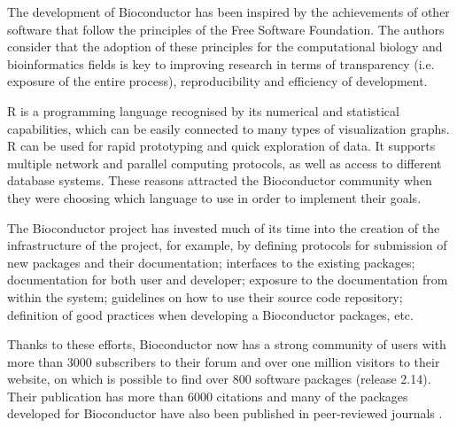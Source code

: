 The development of Bioconductor has been inspired by the achievements of other software that follow the principles of the Free Software Foundation. The authors consider that the adoption of these principles for the computational biology and bioinformatics fields is key to improving research in terms of transparency (i.e. exposure of the entire process), reproducibility and efficiency of development.

R is a programming language recognised by its numerical and statistical capabilities, which can be easily connected to many types of visualization graphs. R can be used for rapid prototyping and quick exploration of data. It supports multiple network and parallel computing protocols, as well as access to different database systems. These reasons attracted the Bioconductor community when they were choosing which language to use in order to implement their goals.

The Bioconductor project has invested much of its time into the creation of the infrastructure of the project, for example, by defining protocols for submission of new packages and their documentation; interfaces to the existing packages; documentation for both user and developer; exposure to the documentation from within the system; guidelines on how to use their source code repository; definition of good practices when developing a Bioconductor packages, etc.

Thanks to these efforts, Bioconductor now has a strong community of users with more than 3000 subscribers to their forum and over one million visitors to their website, on which is possible to find over 800 software packages (release 2.14). Their publication \cite{GEN2004} has more than 6000 citations and many of the packages developed for Bioconductor have also been published in peer-reviewed journals \cite{BIO2014}.


